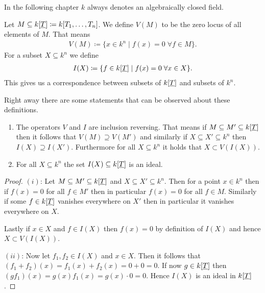 \documentclass[../notes.tex]{subfiles}
\begin{document}
In the following chapter $k$ always denotes an algebraically closed field.

\smallskip

\begin{defi}{}{}
  Let $M \subseteq k[{\underline{T}}] \coloneqq k[T_1, \dots, T_n]$. We define $V(M)$ to be
  the zero locus of all elements of $M$. That means
  \begin{align*}
    V(M) \coloneqq \{x \in k^n \mid f(x) = 0 \; \forall f \in M\}.
  \end{align*}
  For a subset $X \subseteq k^n$ we define
  \begin{align*}
    I(X) \coloneqq \{f \in k[{\underline{T}}] \mid f(x) = 0 \; \forall x \in X\}.
  \end{align*}
  This gives us a correspondence between subsets of $k[{\underline{T}}]$ and subsets of $k^n$.
\end{defi}

\smallskip
\noindent
Right away there are some statements that can be observed about these definitions.

\smallskip

\begin{rem}{}{}
  \begin{enumerate}[($(i)$)]
  \item The operators $V$ and $I$ are inclusion reversing. That means if
    $M \subseteq M' \subseteq k[{\underline{T}}]$ then it follows that $V(M) \supseteq V(M')$
    and similarly if $X \subseteq X' \subseteq k^n$ then $I(X) \supseteq I(X')$.
    Furthermore for all $X \subseteq k^n$ it holds that $X \subset V(I(X))$.

  \item For all $X \subseteq k^n$ the set $I(X) \subseteq k[{\underline{T}}]$ is an ideal.
  \end{enumerate}
\end{rem}

\begin{proof}
  $(i)$: Let $M \subseteq M' \subseteq k[{\underline{T}}]$ and $X \subseteq X' \subseteq k^n$.
  Then for a point $x \in k^n$ then if $f(x) = 0$ for all $f \in M'$ then in particular
  $f(x) = 0$ for all $f \in M$. Similarly if some $f \in k[{\underline{T}}]$ vanishes everywhere on $X'$
  then in particular it vanishes everywhere on $X$.

  \noindent Lastly if $x \in X$ and $f \in I(X)$ then $f(x) = 0$ by definition of $I(X)$
  and hence $X \subset V(I(X))$.

  \smallskip
  \noindent
  $(ii)$: Now let $f_1, f_2 \in I(X)$ and $x \in X$. Then it follows that
  $(f_1 + f_2)(x) = f_1(x) + f_2(x) = 0 + 0 = 0$. If now $g \in k[{\underline{T}}]$ then
  $(gf_1)(x) = g(x)f_1(x) = g(x) \cdot 0 = 0$. Hence $I(X)$ is an ideal in $k[{\underline{T}}]$.
  
\end{proof}
\end{document}
